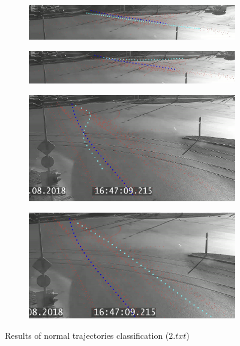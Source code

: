 \begin{figure}[!htb]
	\centering
	\begin{subfigure}[!htb]{0.97\textwidth}
		\centering{}
		\includegraphics[width=\textwidth]{images/classif-res/classif-norm-res-2-1.jpeg}
		\caption{}
	\end{subfigure}
	\hfill
	\begin{subfigure}[!htb]{0.97\textwidth}
		\centering{}
		\includegraphics[width=\textwidth]{images/classif-res/classif-norm-res-2-2.jpeg}
		\caption{}
	\end{subfigure}
	\hfill
	\begin{subfigure}[!htb]{0.485\textwidth}
		\centering{}
		\includegraphics[width=\textwidth]{images/classif-res/classif-norm-res-2-3.jpeg}
		\caption{}
	\end{subfigure}
	\hfill
	\begin{subfigure}[!htb]{0.485\textwidth}
		\centering{}
		\includegraphics[width=\textwidth]{images/classif-res/classif-norm-res-2-4.jpeg}
		\caption{}
	\end{subfigure}
	
	\caption{Results of normal trajectories classification ($2.txt$)}
	\label{fig:classif-norm-res-2}
\end{figure}

